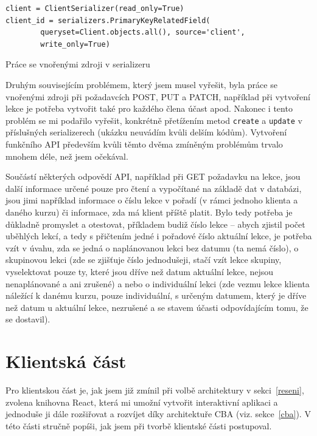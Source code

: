     \begin{listing}[ht]
    	\begin{verbatim}
client = ClientSerializer(read_only=True)
client_id = serializers.PrimaryKeyRelatedField(
        queryset=Client.objects.all(), source='client',
        write_only=True)
    	\end{verbatim}
    	\caption{Práce se vnořenými zdroji v serializeru}\label{lst:apiserializer2}
    \end{listing}
    
    Druhým souvisejícím problémem, který jsem musel vyřešit, byla práce se vnořenými zdroji při požadavcích POST, PUT a PATCH, například při vytvoření lekce je potřeba vytvořit také pro každého člena účast apod. Nakonec i tento problém se mi podařilo vyřešit, konkrétně přetížením metod \verb|create| a \verb|update| v příslušných serializerech (ukázku neuvádím kvůli delším kódům). Vytvoření funkčního API především kvůli těmto dvěma zmíněným problémům trvalo mnohem déle, než jsem očekával.
    
    Součástí některých odpovědí API, například při GET požadavku na lekce, jsou další informace určené pouze pro čtení a vypočítané na základě dat v databázi, jsou jimi například informace o číslu lekce v pořadí (v rámci jednoho klienta a daného kurzu) či informace, zda má klient příště platit. Bylo tedy potřeba je důkladně promyslet a otestovat, příkladem budiž číslo lekce -- abych zjistil počet uběhlých lekcí, a tedy s přičtením jedné i pořadové číslo aktuální lekce, je potřeba vzít v úvahu, zda se jedná o naplánovanou lekci bez datumu (ta nemá číslo), o skupinovou lekci (zde se zjišťuje číslo jednodušeji, stačí vzít lekce skupiny, vyselektovat pouze ty, které jsou dříve než datum aktuální lekce, nejsou nenaplánované a ani zrušené) a nebo o individuální lekci (zde vezmu lekce klienta náležící k danému kurzu, pouze individuální, s určeným datumem, který je dříve než datum u aktuální lekce, nezrušené a se stavem účasti odpovídajícím tomu, že se dostavil).
    
    \section{Klientská část}
    Pro klientskou část je, jak jsem již zmínil při volbě architektury v sekci~\ref{reseni}, zvolena knihovna React, která mi umožní vytvořit interaktivní aplikaci a jednoduše ji dále rozšiřovat a rozvíjet díky architektuře CBA (viz. sekce~\ref{cba}). V této části stručně popíši, jak jsem při tvorbě klientské části postupoval.
    
